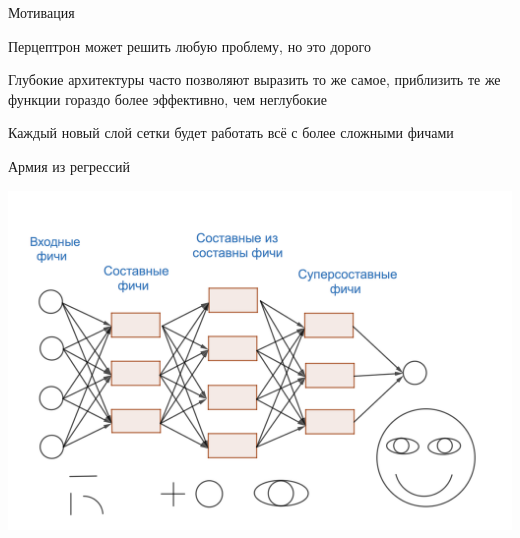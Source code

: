 \documentclass[notes,12pt, aspectratio=169]{beamer}
\newenvironment{wideitemize}{\itemize\addtolength{\itemsep}{10pt}}{\enditemize}
\begin{document}
\begin{frame}{Мотивация}
\begin{wideitemize}
\item Перцептрон может решить любую проблему, но это дорого

\item Глубокие архитектуры часто позволяют выразить то же самое, приблизить те же функции гораздо более эффективно, чем неглубокие

\item Каждый новый слой сетки будет работать всё с более сложными фичами
\end{wideitemize}
\end{frame}


\begin{frame}{Армия из регрессий}
\begin{center}
	\includegraphics[width=0.73\paperwidth]{network_1.png}
\end{center}
\end{frame}
\end{document}
